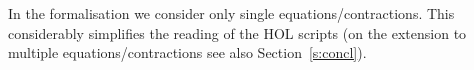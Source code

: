 In the
formalisation we consider only single equations/contractions. 
This considerably simplifies the  reading of the HOL scripts (on 
the extension  to multiple equations/contractions
see also  Section~\ref{s:concl}).




